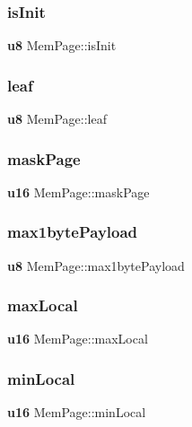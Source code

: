 \mbox{\label{struct_mem_page_a3ab4ace46245be0fb2fb19eaa2862019}} 
\subsubsection{isInit}
{\footnotesize\ttfamily \textbf{ u8} Mem\+Page\+::is\+Init}

\mbox{\label{struct_mem_page_af18504bd0a2e7d39d9b485d434af0447}} 
\subsubsection{leaf}
{\footnotesize\ttfamily \textbf{ u8} Mem\+Page\+::leaf}

\mbox{\label{struct_mem_page_aa3d64e8755cc9f431bbc8423a2b506ec}} 
\subsubsection{maskPage}
{\footnotesize\ttfamily \textbf{ u16} Mem\+Page\+::mask\+Page}

\mbox{\label{struct_mem_page_a79548547cafb0e6d8549006bdc553f0a}} 
\subsubsection{max1bytePayload}
{\footnotesize\ttfamily \textbf{ u8} Mem\+Page\+::max1byte\+Payload}

\mbox{\label{struct_mem_page_a36394b7c3abf4652e7a24be4ab314f13}} 
\subsubsection{maxLocal}
{\footnotesize\ttfamily \textbf{ u16} Mem\+Page\+::max\+Local}

\mbox{\label{struct_mem_page_a95cab31aa57bf8b478be273557c5c807}} 
\subsubsection{minLocal}
{\footnotesize\ttfamily \textbf{ u16} Mem\+Page\+::min\+Local}

